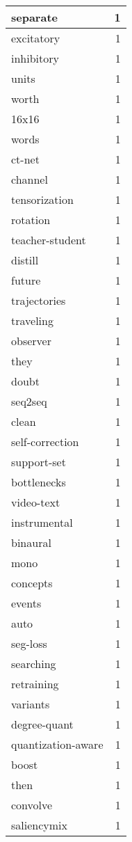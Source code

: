 \begin{table}[h]
\begin{tabular}{|l|r|}
\hline
separate & 1 \\
\hline
excitatory & 1 \\
\hline
inhibitory & 1 \\
\hline
units & 1 \\
\hline
worth & 1 \\
\hline
16x16 & 1 \\
\hline
words & 1 \\
\hline
ct-net & 1 \\
\hline
channel & 1 \\
\hline
tensorization & 1 \\
\hline
rotation & 1 \\
\hline
teacher-student & 1 \\
\hline
distill & 1 \\
\hline
future & 1 \\
\hline
trajectories & 1 \\
\hline
traveling & 1 \\
\hline
observer & 1 \\
\hline
they & 1 \\
\hline
doubt & 1 \\
\hline
seq2seq & 1 \\
\hline
clean & 1 \\
\hline
self-correction & 1 \\
\hline
support-set & 1 \\
\hline
bottlenecks & 1 \\
\hline
video-text & 1 \\
\hline
instrumental & 1 \\
\hline
binaural & 1 \\
\hline
mono & 1 \\
\hline
concepts & 1 \\
\hline
events & 1 \\
\hline
auto & 1 \\
\hline
seg-loss & 1 \\
\hline
searching & 1 \\
\hline
retraining & 1 \\
\hline
variants & 1 \\
\hline
degree-quant & 1 \\
\hline
quantization-aware & 1 \\
\hline
boost & 1 \\
\hline
then & 1 \\
\hline
convolve & 1 \\
\hline
saliencymix & 1 \\
\hline

\end{tabular}
\end{table}

